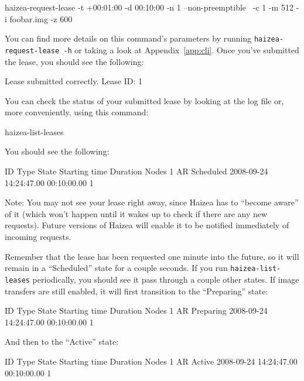 \begin{wideshellverbatim}
haizea-request-lease -t +00:01:00 -d 00:10:00 -n 1 --non-preemptible \
                     -c 1 -m 512 -i foobar.img -z 600 
\end{wideshellverbatim}

You can find more details on this command's parameters by running \texttt{haizea-request-lease -h} or taking a look at Appendix~\ref{app:cli}. Once you've submitted the lease, you should see the following:

\begin{wideshellverbatim}
Lease submitted correctly.
Lease ID: 1
\end{wideshellverbatim}

You can check the status of your submitted lease by looking at the log file or, more conveniently, using this command:

\begin{shellverbatim}
haizea-list-leases
\end{shellverbatim}

You should see the following:

\begin{wideshellverbatim}
 ID   Type  State      Starting time           Duration      Nodes  
 1    AR    Scheduled  2008-09-24 14:24:47.00  00:10:00.00   1       
\end{wideshellverbatim}

Note: You may not see your lease right away, since Haizea has to ``become aware'' of it (which won't happen until it wakes up to check if there are any new requests). Future versions of Haizea will enable it to be notified immediately of incoming requests.

Remember that the lease has been requested one minute into the future, so it will remain in a ``Scheduled'' state for a couple seconds. If you run \texttt{haizea-list-leases} periodically, you should see it pass through a couple other states. If image transfers are still enabled, it will first transition to the ``Preparing'' state:

\begin{wideshellverbatim}
 ID   Type  State      Starting time           Duration      Nodes  
 1    AR    Preparing  2008-09-24 14:24:47.00  00:10:00.00   1       
\end{wideshellverbatim}

And then to the ``Active'' state:

\begin{wideshellverbatim}
 ID   Type  State      Starting time           Duration      Nodes  
 1    AR    Active     2008-09-24 14:24:47.00  00:10:00.00   1       
\end{wideshellverbatim}

